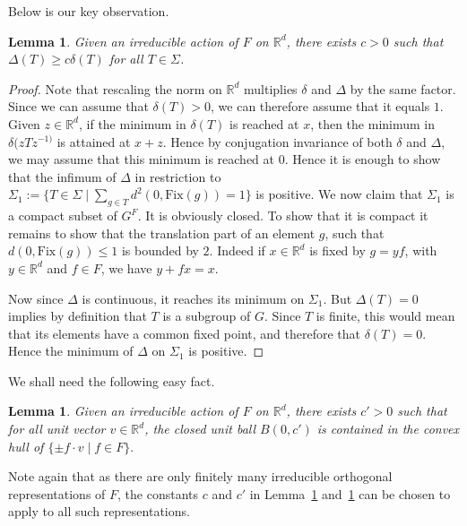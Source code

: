 \documentclass[11pt,leqno]{article}
\theoremstyle{plain}
\newtheorem{lemma}[theorem]{Lemma}
\theoremstyle{definition}
\theoremstyle{remark}
\numberwithin{equation}{section}
\newcommand{\R}{\mathbb{R}}
\begin{document}
Below is our key observation.

\begin{lemma}\label{lem:deltaDelta}
Given an irreducible action of $F$ on $\mathbb{R}^d$,
there exists $c>0$ such that $\Delta(T)\geq c\delta(T)$ for all $T\in \Sigma$.
\end{lemma}
\begin{proof}
 Note that rescaling the norm on $\R^d$ multiplies $\delta$ and $\Delta$ by the same factor. Since we can assume that $\delta(T)>0$, we can therefore assume that it equals $1$. Given $z\in \mathbb{R}^d$, if the minimum in $\delta(T)$ is reached at $x$, then the minimum in $\delta(zTz^{-1)}$ is attained at $x+z$. Hence by conjugation invariance of both $\delta$ and $\Delta$, we may assume that this minimum is reached at $0$. 
Hence it is enough to show that the infimum of $\Delta$ in restriction to  $\Sigma_1:=\{T\in \Sigma\mid \sum _{g\in T}d^2(0,\text{Fix}(g))=1\}$ is positive.
We now claim that $\Sigma_1$ is a compact subset of $G^F$. It is obviously closed. To show that it is compact it remains to show that the translation part of an element $g$, such that $d(0,\text{Fix}(g))\leq 1$ is bounded by $2$. Indeed if $x\in \mathbb{R}^d$ is fixed by $g=yf$, with $y\in \mathbb{R}^d$ and $f \in F$, we have $y+fx=x$.

Now since $\Delta$ is continuous, it reaches its minimum on $\Sigma_1$. But $\Delta(T)=0$ implies by definition that $T$ is a subgroup of $G$. Since $T$ is finite, this would mean that its elements have a common fixed point, and therefore that $\delta(T)=0$.
Hence the minimum of $\Delta$ on $\Sigma_1$ is positive. %
\end{proof}

We shall need the following easy fact.

\begin{lemma}\label{lem:irreducible}
Given an irreducible action of $F$ on $\mathbb{R}^d$,
there exists  $c'>0$ such that  for all unit vector $v\in \R^d$, the closed unit ball $B(0,c')$ is contained in the convex hull of $\{\pm f\cdot  v\mid f\in F\}.$
\end{lemma}
Note again that as there are only finitely many irreducible orthogonal representations of $F$, the constants $c$ and $c'$ in Lemma~\ref{lem:deltaDelta} and~\ref{lem:irreducible} can be chosen to apply to all such representations.
\end{document}
